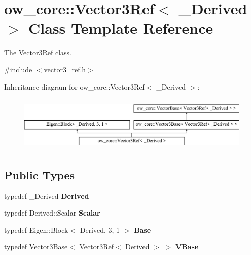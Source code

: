 \hypertarget{classow__core_1_1Vector3Ref}{}\section{ow\+\_\+core\+:\+:Vector3\+Ref$<$ \+\_\+\+Derived $>$ Class Template Reference}
\label{classow__core_1_1Vector3Ref}


The \hyperlink{classow__core_1_1Vector3Ref}{Vector3\+Ref} class.  




{\ttfamily \#include $<$vector3\+\_\+ref.\+h$>$}

Inheritance diagram for ow\+\_\+core\+:\+:Vector3\+Ref$<$ \+\_\+\+Derived $>$\+:\begin{figure}[H]
\begin{center}
\leavevmode
\includegraphics[height=2.692308cm]{d2/d0b/classow__core_1_1Vector3Ref}
\end{center}
\end{figure}
\subsection*{Public Types}
\begin{DoxyCompactItemize}
\item 
typedef \+\_\+\+Derived {\bfseries Derived}\hypertarget{classow__core_1_1Vector3Ref_aa0de46e47cfd8bc910d62ba5b3d5941c}{}\label{classow__core_1_1Vector3Ref_aa0de46e47cfd8bc910d62ba5b3d5941c}

\item 
typedef Derived\+::\+Scalar {\bfseries Scalar}\hypertarget{classow__core_1_1Vector3Ref_a6d7a69e9728df527dfaff6affe5cf78a}{}\label{classow__core_1_1Vector3Ref_a6d7a69e9728df527dfaff6affe5cf78a}

\item 
typedef Eigen\+::\+Block$<$ Derived, 3, 1 $>$ {\bfseries Base}\hypertarget{classow__core_1_1Vector3Ref_ac1a02449afefa75c224d337aea4ef434}{}\label{classow__core_1_1Vector3Ref_ac1a02449afefa75c224d337aea4ef434}

\item 
typedef \hyperlink{classow__core_1_1Vector3Base}{Vector3\+Base}$<$ \hyperlink{classow__core_1_1Vector3Ref}{Vector3\+Ref}$<$ Derived $>$ $>$ {\bfseries V\+Base}\hypertarget{classow__core_1_1Vector3Ref_a3a811d819ac6c81cd1288ec6fc9bfbf7}{}\label{classow__core_1_1Vector3Ref_a3a811d819ac6c81cd1288ec6fc9bfbf7}

\end{DoxyCompactItemize}
